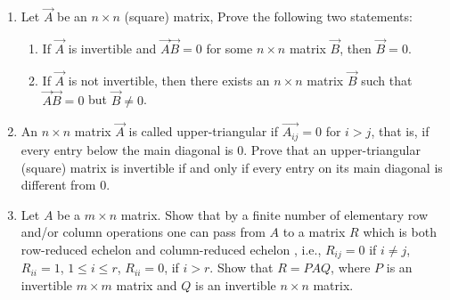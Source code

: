 \begin{enumerate}[label=\thesubsection.\arabic*.,ref=\thesubsection.\theenumi]
\solution

\item Let $\vec{A}$ be an $n \times n$ (square) matrix, Prove the following two statements:
 \begin{enumerate}
   \item If $\vec{A}$ is invertible and $\vec{A}\vec{B}=0$ for some $n \times n$ matrix $\vec{B}$, then $\vec{B}=0$.
   \item If $\vec{A}$ is not invertible, then there exists an $n \times n$ matrix $\vec{B}$ such that $\vec{A}\vec{B}=0$ but $\vec{B} \not= 0$.
 \end{enumerate}
%
\solution

%
\item An $n\times n$ matrix $\vec{A}$ is called upper-triangular if $\vec{A_{ij}}=0$ for $i>j$, that is, if every entry below the main diagonal is 0. Prove that an upper-triangular (square) matrix is invertible if and only if every entry on its main diagonal is different from 0.
\solution

\item Let $A$ be a $m\times n$ matrix. Show that by a finite number of elementary row and/or column operations one can pass from $A$ to a matrix $R$ which is both row-reduced echelon and column-reduced echelon , i.e., $R_{ij}=0$ if $i\neq j$, $R_{ii}=1$, $1\leq i\leq r$, $R_{ii}=0$, if $i>r$. Show that $R = PAQ$, where $P$ is an invertible $m\times m$ matrix and $Q$ is an invertible $n\times n$ matrix.
\\
\solution

\end{enumerate}



